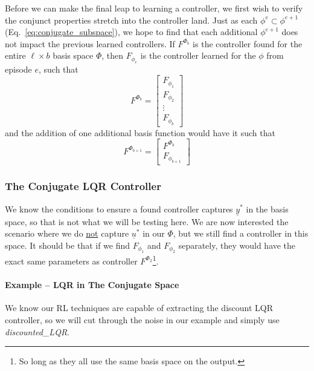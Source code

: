 Before we can make the final leap to learning a controller, we first wish to verify the conjunct properties stretch into the controller land. Just as each $\phi^{e} \subset \phi^{e+1}$ (Eq.~\ref{eq:conjugate_subspace}), we hope to find that each additional $\phi^{e+1}$ does not impact the previous learned controllers. If $F^{\Phi_b}$ is the controller found for the entire $\ell \times b$ basis space $\Phi$, then $F_{\phi_e}$ is the controller learned for the $\phi$ from episode $e$, such that
\begin{equation}
    F^{\Phi_b} = \begin{bmatrix}
        F_{\phi_1} \\ F_{\phi_2} \\ \vdots \\ F_{\phi_b}
    \end{bmatrix}
\end{equation}
and the addition of one additional basis function would have it such that
\begin{equation}
    F^{\Phi_{b+1}} = \begin{bmatrix}
        F^{\Phi_b} \\ F_{\phi_{b+1}}
    \end{bmatrix}
\end{equation}

\FloatBarrier\subsubsection{The Conjugate LQR Controller}
We know the conditions to ensure a found controller captures $\underline{y}^\ast$ in the basis space, so that is not what we will be testing here. We are now interested the scenario where we do \underline{not} capture $\underline{u}^\ast$ in our $\Phi$, but we still find a controller in this space. It should be that if we find $F_{\phi_1}$ and $F_{\phi_2}$ separately, they would have the exact same parameters as controller $F^{\Phi_2}$\footnote{So long as they all use the same basis space on the output.}.

\FloatBarrier\paragraph{Example -- LQR in The Conjugate Space}
We know our RL techniques are capable of extracting the discount LQR controller, so we will cut through the noise in our example and simply use \textit{discounted\_LQR}.

